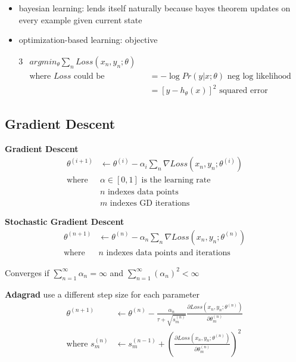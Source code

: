 \documentclass[]{article}
\theoremstyle{definition}
\begin{document}
\begin{itemize}
    \item bayesian learning: lends itself naturally because bayes theorem updates on every example given current state
    \item optimization-based learning: objective
\end{itemize}

\begin{alignat*}{3}
    & argmin_\theta \sum_n Loss(x_n, y_n; \theta) \\
    & \text{where } Loss \text{ could be} &&= - \log Pr(y|x;\theta) \text{ neg log likelihood} \\
    & &&= [y - h_\theta (x)]^2 \text{ squared error}
\end{alignat*}

\subsection{Gradient Descent}
\label{sub:gradient_descent}

\textbf{Gradient Descent}
\begin{align*}
    \theta^{(i+1)} & \gets \theta^{(i)} - \alpha_i \sum_n \nabla Loss(x_n, y_n; \theta^{(i)}) \\
    \text{where } & \alpha \in [0,1] \text{ is the learning rate} \\
    &n \text{ indexes data points} \\
    &m \text{ indexes GD iterations}
\end{align*}

\textbf{Stochastic Gradient Descent}
\begin{align*}
    \theta^{(n+1)} & \gets \theta^{(n)} - \alpha_n \sum_n \nabla Loss(x_n, y_n; \theta^{(n)}) \\
    \text{where } & n \text{ indexes data points and iterations}
\end{align*}

Converges if $\sum_{n=1}^\infty \alpha_n = \infty$ and $\sum_{n=1}^\infty (\alpha_n)^2 < \infty$

\bigskip

\textbf{Adagrad} use a different step size for each parameter
\begin{align*}
    \theta^{(n+1)} & \gets \theta^{(n)} - \frac{\alpha_n}{\tau + \sqrt{s_m^{(n)}}} \frac{\partial Loss(x_n, y_n; \theta^{(n)})}{\partial \theta_m^{(n)}} \\
    \text{where } s_m^{(n)} & \gets s_m^{(n-1)} +  \left(\frac{\partial Loss(x_n, y_n; \theta^{(n)})}{\partial \theta_m^{(n)}}\right)^2 \\
\end{align*}
\end{document}
